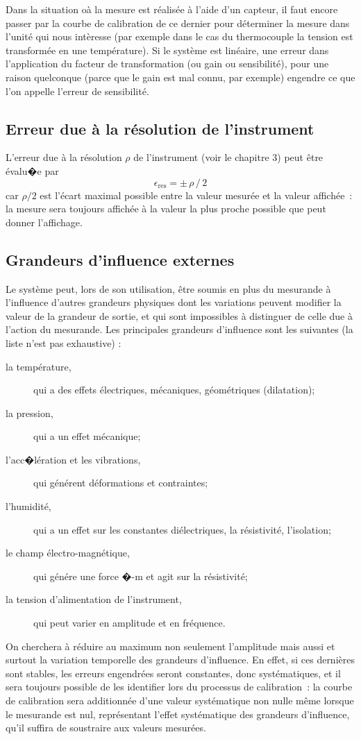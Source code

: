Dans la situation oà la mesure est réalisée à l'aide d'un capteur, il faut encore passer par la courbe de calibration de ce dernier pour déterminer la mesure dans l'unité qui nous intèresse (par exemple dans le cas du thermocouple la tension est transformée en une température). Si le système est linéaire, une erreur dans l'application du facteur de transformation (ou gain ou sensibilité), pour une raison quelconque (parce que le gain est mal connu, par exemple) engendre ce que l'on appelle l'erreur de sensibilité.

\subsection{Erreur due à la résolution de l'instrument}

L'erreur due à la résolution $\rho$ de l'instrument (voir le chapitre 3) peut être évalu�e par
$$\epsilon_{\text{res}}=\pm\,\rho\,/\,2$$
car $\rho/2$ est l'écart maximal possible entre la valeur mesurée et la valeur affichée~: la mesure sera toujours affichée à la valeur la plus proche possible que peut donner l'affichage.

\subsection{Grandeurs d'influence externes}

Le système peut, lors de son utilisation, être soumis en plus du mesurande à l'influence d'autres grandeurs physiques dont les variations peuvent modifier la valeur de la grandeur de sortie, et qui sont impossibles à distinguer de celle due à l'action du mesurande. Les principales grandeurs d'influence sont les suivantes (la liste n'est pas exhaustive) :
\begin{description}
\item[la température,] qui a des effets électriques, mécaniques, géométriques (dilatation);
\item[la pression,] qui a un effet mécanique;
\item[l'acc�lération et les vibrations,] qui générent déformations et contraintes;
\item[l'humidité,] qui a un effet sur les constantes diélectriques, la résistivité, l'isolation;
\item[le champ électro-magnétique,] qui génére une force �-m et agit sur la résistivité;
\item[la tension d'alimentation de l'instrument,] qui peut varier en amplitude et en fréquence.
\end{description}
On cherchera à réduire au maximum non seulement l'amplitude mais aussi et surtout la variation temporelle des grandeurs d'influence. En effet, si ces dernières sont stables, les erreurs engendrées seront constantes, donc systématiques, et il sera toujours possible de les identifier lors du processus de calibration~: la courbe de calibration sera additionnée d'une valeur systématique non nulle même lorsque le mesurande est nul, représentant l'effet systématique des grandeurs d'influence, qu'il suffira de soustraire aux valeurs mesurées.

